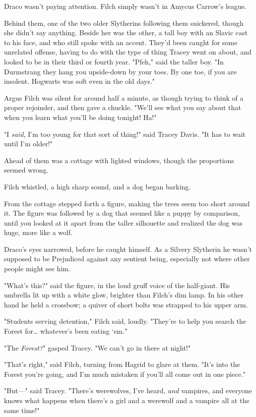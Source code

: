 Draco wasn't paying attention. Filch simply wasn't in Amycus Carrow's league.

Behind them, one of the two older Slytherins following them snickered, though
she didn't say anything. Beside her was the other, a tall boy with an Slavic
cast to his face, and who still spoke with an accent. They'd been caught for
some unrelated offense, having to do with the type of thing Tracey went on
about, and looked to be in their third or fourth year. "Pfeh," said the taller
boy. "In Durmstrang they hang you upside-down by your toes. By one toe, if you
are insolent. Hogwarts was soft even in the old days."

Argus Filch was silent for around half a minute, as though trying to think of a
proper rejoinder, and then gave a chuckle. "We'll see what you say about
that{\el} when you learn what you'll be doing tonight! Ha!"

"I \emph{said,} I'm too young for that sort of thing!" said Tracey Davis. "It
has to wait until I'm older!"

Ahead of them was a cottage with lighted windows, though the proportions seemed
wrong.

Filch whistled, a high sharp sound, and a dog began barking.

From the cottage stepped forth a figure, making the trees seem too short around
it. The figure was followed by a dog that seemed like a puppy by comparison,
until you looked at it apart from the taller silhouette and realized the dog
was huge, more like a wolf.

Draco's eyes narrowed, before he caught himself. As a Silvery Slytherin he
wasn't supposed to be Prejudiced against any sentient being, especially not
where other people might see him.

"What's this?" said the figure, in the loud gruff voice of the half-giant. His
umbrella lit up with a white glow, brighter than Filch's dim lamp. In his other
hand he held a crossbow; a quiver of short bolts was strapped to his upper arm.

"Students serving detention," Filch said, loudly. "They're to help you search
the Forest for… whatever's been eating `em."

"The \emph{Forest?}" gasped Tracey. "We can't go in there at night!"

"That's right," said Filch, turning from Hagrid to glare at them. "It's into
the Forest you're going, and I'm much mistaken if you'll all come out in one
piece."

"But\mbox{---}" said Tracey. "There's werewolves, I've heard, \emph{and} vampires, and
everyone knows what happens when there's a girl and a werewolf and a vampire
all at the same time!"

